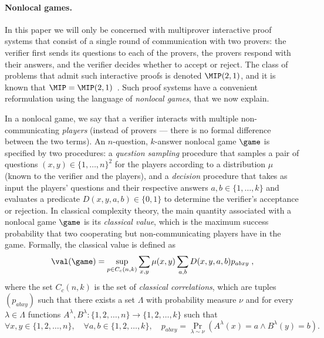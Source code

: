 \paragraph{Nonlocal games.}
In this paper we will only be concerned with multiprover interactive proof systems that consist of a single round of communication with two provers: the verifier first sends its questions to each of the provers, the provers respond with their answers, and the verifier decides whether to accept or reject. The class of problems that admit such interactive proofs is denoted $\MIP(2,1)$, and it is known that $\MIP=\MIP(2,1)$~\cite{feige1992two}. Such proof systems have a convenient reformulation using the language of \emph{nonlocal games}, that we now explain. 

In a nonlocal game, we say that a verifier interacts with multiple non-communicating \emph{players} (instead of provers --- there is no formal difference between the two terms). An $n$-question, $k$-answer nonlocal game $\game$ is specified by two procedures: a \emph{question sampling} procedure that samples a pair of questions $(x,y)\in \{1,\ldots,n\}^2$ for the players according to a distribution $\mu$ (known to the verifier and the players), and a \emph{decision} procedure that takes as input the players' questions and their respective answers $a,b\in\{1,\ldots,k\}$ and evaluates a predicate $D(x,y,a,b)\in \{0,1\}$ to determine the verifier's acceptance or rejection. In classical complexity theory, the main quantity associated with a nonlocal game $\game$ is its \emph{classical value}, which is the maximum success probability that two cooperating but non-communicating players have in the game. Formally, the classical value is defined as
\begin{equation}\label{eq:class-val}
 \val(\game) = \sup_{p\in C_c(n,k)} \sum_{x,y} \mu(x,y) \sum_{a,b} D(x,y,a,b) p_{abxy}\;,
\end{equation}
where the set $C_c(n,k)$ is the set of \emph{classical correlations}, which are tuples $(p_{abxy})$ such that there exists a set $\Lambda$ with probability measure $\nu$ and for every $\lambda \in \Lambda$ functions $A^\lambda,B^\lambda: \{1,2,\ldots,n\} \to \{1,2,\ldots,k\}$ such that
\[
	\forall x,y \in \{1,2,\ldots,n\}, \quad \forall a,b \in \{1,2,\ldots,k\}, \quad p_{abxy} = \Pr_{\lambda \sim \nu} (A^\lambda(x) = a \wedge B^\lambda(y) = b).
\]
